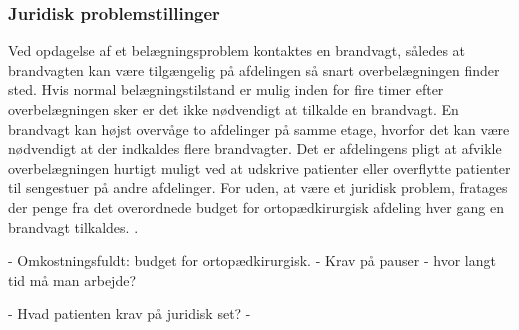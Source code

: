 \subsubsection{Juridisk problemstillinger}
Ved opdagelse af et belægningsproblem kontaktes en brandvagt, således at brandvagten kan være tilgængelig på afdelingen så snart overbelægningen finder sted. Hvis normal belægningstilstand er mulig inden for fire timer efter overbelægningen sker er det ikke nødvendigt at tilkalde en brandvagt. En brandvagt kan højst overvåge to afdelinger på samme etage, hvorfor det kan være nødvendigt at der indkaldes flere brandvagter. Det er afdelingens pligt at  afvikle overbelægningen hurtigt muligt ved at udskrive patienter eller overflytte patienter til sengestuer på andre afdelinger. \cite{Beredskab2016} For uden, at være et juridisk problem, fratages der penge fra det overordnede budget for ortopædkirurgisk afdeling hver gang en brandvagt tilkaldes. \cite{KILDE - er i tvivl om det går ud over den enkelte afdeling eller om det er samlet budget for sygehuset??}.

- Omkostningsfuldt: budget for ortopædkirurgisk.
- Krav på pauser - hvor langt tid må man arbejde?

- Hvad patienten krav på juridisk set?
- 







